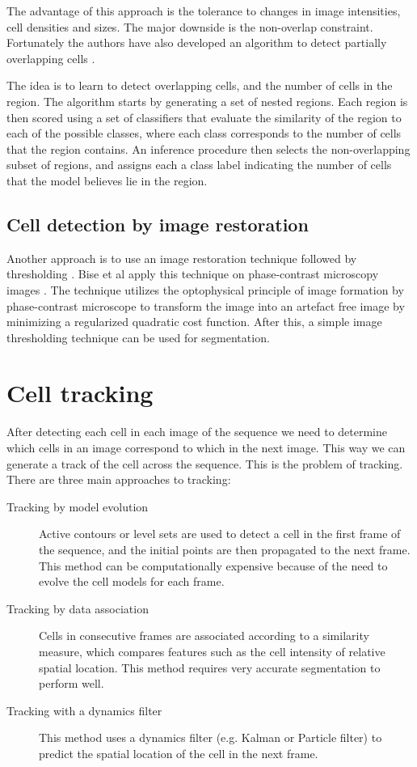 \documentclass[12pt,a4paper,openany]{book}
\begin{document}
The advantage of this approach is the tolerance to changes in image intensities, cell densities and sizes. The major downside is the non-overlap constraint. Fortunately the authors have also developed an algorithm to detect partially overlapping cells \cite{arteta13}. 

The idea is to learn to detect overlapping cells, and the number of cells in the region. The algorithm starts by generating a set of nested regions. Each region is then scored using a set of classifiers that evaluate the similarity of the region to each of the possible classes, where each class corresponds to the number of cells that the region contains. An inference procedure then selects the non-overlapping subset of regions, and assigns each a class label indicating the number of cells that the model believes lie in the region. 

\subsection{Cell detection by image restoration}

Another approach is to use an image restoration technique followed by thresholding \cite{bise11} \cite{huh13}. Bise et al \cite{bise11} apply this technique on phase-contrast microscopy images . The technique utilizes the optophysical principle of image formation by phase-contrast microscope to transform the image into an artefact free image by minimizing a regularized quadratic cost function. After this, a simple image thresholding technique can be used for segmentation.

\section{Cell tracking}
\label{sec:tracking}

After detecting each cell in each image of the sequence we need to determine which cells in an image correspond to which in the next image. This way we can generate a track of the cell across the sequence. This is the problem of tracking. There are three main approaches to tracking:

\begin{description}
	\item [Tracking by model evolution] Active contours or level sets are used to detect a cell in the first frame of the sequence, and the initial points are then propagated to the next frame. This method can be computationally expensive because of the need to evolve the cell models for each frame.
	\item [Tracking by data association] Cells in consecutive frames are associated according to a similarity measure, which compares features such as the cell intensity of relative spatial location. This method requires very accurate segmentation to perform well.
	\item [Tracking with a dynamics filter] This method uses a dynamics filter (e.g. Kalman or Particle filter) to predict the spatial location of the cell in the next frame.
\end{description}
\end{document}
